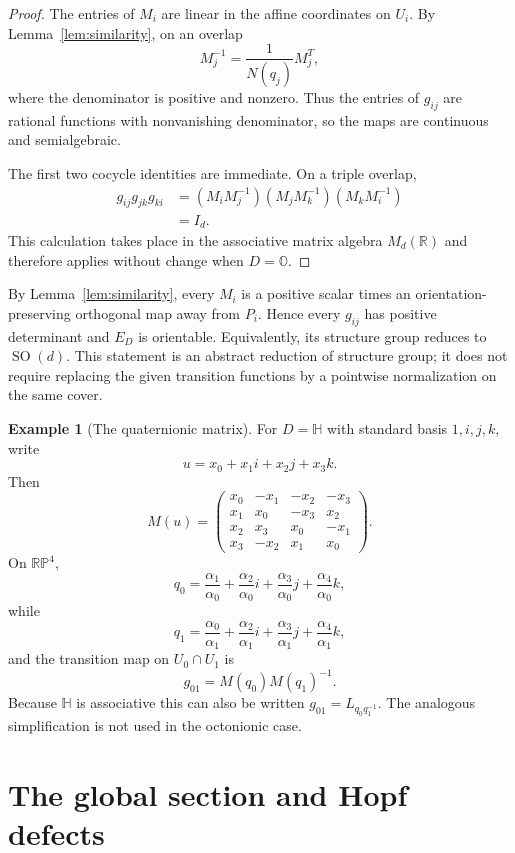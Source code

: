 \documentclass[12pt]{article}
\theoremstyle{plain}
\theoremstyle{definition}
\newtheorem{example}[theorem]{Example}
\newcommand{\R}{\mathbb R}
\newcommand{\Hh}{\mathbb H}
\newcommand{\Oct}{\mathbb O}
\newcommand{\RP}{\mathbb{RP}}
\newcommand{\SO}{\operatorname{SO}}
\begin{document}
\begin{proof}
	The entries of $M_i$ are linear in the affine coordinates on $U_i$.
	By Lemma~\ref{lem:similarity}, on an overlap
	\[
	M_j^{-1}=\frac{1}{N(q_j)}M_j^T,
	\]
	where the denominator is positive and nonzero. Thus the entries of
	$g_{ij}$ are rational functions with nonvanishing denominator, so the
	maps are continuous and semialgebraic.
	
	The first two cocycle identities are immediate. On a triple overlap,
	\[
	\begin{aligned}
		g_{ij}g_{jk}g_{ki}
		&=(M_iM_j^{-1})(M_jM_k^{-1})(M_kM_i^{-1})\\
		&=I_d.
	\end{aligned}
	\]
	This calculation takes place in the associative matrix algebra
	$M_d(\R)$ and therefore applies without change when $D=\Oct$.
\end{proof}


By Lemma~\ref{lem:similarity}, every $M_i$ is a positive scalar times
an orientation-preserving orthogonal map away from $P_i$. Hence every
$g_{ij}$ has positive determinant and $E_D$ is orientable. Equivalently,
its structure group reduces to $\SO(d)$. This statement is an abstract
reduction of structure group; it does not require replacing the given
transition functions by a pointwise normalization on the same cover.

\begin{example}[The quaternionic matrix]
	\label{ex:quaternion-matrix}
	For $D=\Hh$ with standard basis $1,i,j,k$, write
	\[
	u=x_0+x_1i+x_2j+x_3k.
	\]
	Then
	\[
	M(u)=
	\begin{pmatrix}
		x_0 & -x_1 & -x_2 & -x_3\\
		x_1 & x_0 & -x_3 & x_2\\
		x_2 & x_3 & x_0 & -x_1\\
		x_3 & -x_2 & x_1 & x_0
	\end{pmatrix}.
	\]
	On $\RP^4$,
	\[
	q_0=
	\frac{\alpha_1}{\alpha_0}
	+\frac{\alpha_2}{\alpha_0}i
	+\frac{\alpha_3}{\alpha_0}j
	+\frac{\alpha_4}{\alpha_0}k,
	\]
	while
	\[
	q_1=
	\frac{\alpha_0}{\alpha_1}
	+\frac{\alpha_2}{\alpha_1}i
	+\frac{\alpha_3}{\alpha_1}j
	+\frac{\alpha_4}{\alpha_1}k,
	\]
	and the transition map on $U_0\cap U_1$ is
	\[
	g_{01}=M(q_0)M(q_1)^{-1}.
	\]
	Because $\Hh$ is associative this can also be written
	$g_{01}=L_{q_0q_1^{-1}}$. The analogous simplification is not used in
	the octonionic case.
\end{example}

\section{The global section and Hopf defects}
\label{sec:defects}
\end{document}
